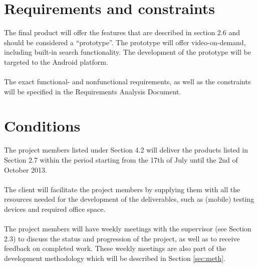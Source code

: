 \section{Requirements and constraints}
The final product will offer the features that are described in section 2.6 and should be considered a ``prototype''. The prototype will offer video-on-demand, including built-in search functionality. The development of the prototype will be targeted to the Android platform. \\
\\
The exact functional- and nonfunctional requirements, as well as the constraints will be specified in the Requirements Analysis Document.
\section{Conditions}
The project members listed under Section 4.2 will deliver the products listed in Section 2.7 within the period starting from the 17th of July until the 2nd of October 2013.\\
\\
The client will facilitate the project members by supplying them with all the resources needed for the development of the deliverables, such as (mobile) testing devices and required office space.\\
\\
The project members will have weekly meetings with the supervisor (see Section 2.3) to discuss the status and progression of the project, as well as to receive feedback on completed work. These weekly meetings are also part of the development methodology which will be described in Section \ref{sec:meth}.